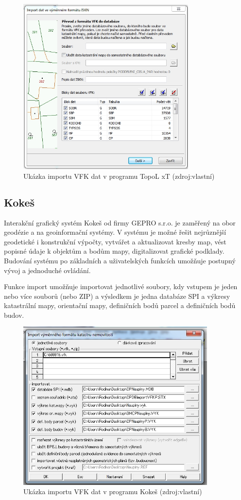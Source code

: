 \begin{figure}[H]
	 \centering
      \includegraphics[height=9cm]{./pictures/topol.png}
      \caption{Ukázka importu VFK dat v programu TopoL xT (zdroj:vlastní)}
      \label{fig:topol}
  \end{figure}
\subsection{Kokeš}
Interakční grafický systém Kokeš od firmy GEPRO s.r.o. je zaměřený na obor geodézie a na geoinformační systémy. V systému je možné řešit nejrůznější geodetické i konstrukční výpočty, vytvářet a aktualizovat kresby map, vést popisné údaje k objektům a bodům mapy, digitalizovat grafické podklady. Budování systému po základních a uživatelských funkcích umožňuje postupný vývoj a jednoduché ovládání. \cite{kokes_cvut}

Funkce import  umožňuje importovat jednotlivé soubory, kdy vstupem je jeden nebo více souborů  (nebo ZIP) a výsledkem je jedna databáze SPI a výkresy katastrální mapy, orientační mapy, definičních bodů parcel a definičních bodů budov. %

\begin{figure}[H]
	 \centering
      \includegraphics[width=10cm]{./pictures/kokes.png}
      \caption{Ukázka importu VFK dat v programu Kokeš (zdroj:vlastní)}
      \label{fig:kokes}
  \end{figure}
  
